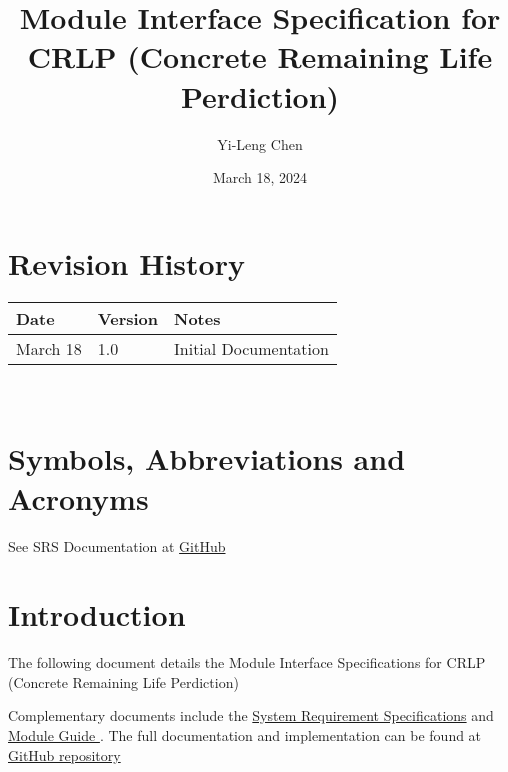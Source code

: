\documentclass[12pt, titlepage]{article}
\begin{document}
\title{Module Interface Specification for CRLP (Concrete Remaining Life Perdiction)}

\author{Yi-Leng Chen}

\date{March 18, 2024}

\maketitle


\section{Revision History}

\begin{tabularx}{\textwidth}{p{3cm}p{2cm}X}
\toprule {\bf Date} & {\bf Version} & {\bf Notes}\\
\midrule
March 18 & 1.0 & Initial Documentation\\
\bottomrule
\end{tabularx}

~\newpage

\section{Symbols, Abbreviations and Acronyms}

See SRS Documentation at \href{https://github.com/kypss94132/CAS741_YiLeng-Chen/blob/main/docs/SRS/SRS.pdf}{GitHub}

\newpage

\tableofcontents

\newpage


\section{Introduction}

The following document details the Module Interface Specifications for CRLP (Concrete Remaining Life Perdiction)

Complementary documents include the \href{https://github.com/kypss94132/CAS741_YiLeng-Chen/blob/main/docs/SRS/SRS.pdf}{System Requirement Specifications} and \href{https://github.com/kypss94132/CAS741_YiLeng-Chen/blob/main/docs/Design/SoftArchitecture/MG.pdf}{Module Guide }. The full documentation and implementation can be found at \href{https://github.com/kypss94132/CAS741_YiLeng-Chen/tree/main/docs}{GitHub repository}
\end{document}
